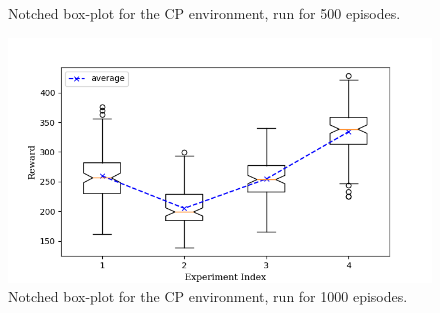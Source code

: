 \documentclass[hidelinks,journal]{IEEEtran}
\begin{document}
\begin{figure}[p]
  \caption{Notched box-plot for the CP environment, run for 500 episodes.}
  \label{fig:cp3ResBox}
  \includegraphics[scale=0.45]{graph/cp4ResBox.png}
  \caption{Notched box-plot for the CP environment, run for 1000 episodes.}
  \label{fig:cp4ResBox}
\end{figure}
\end{document}
